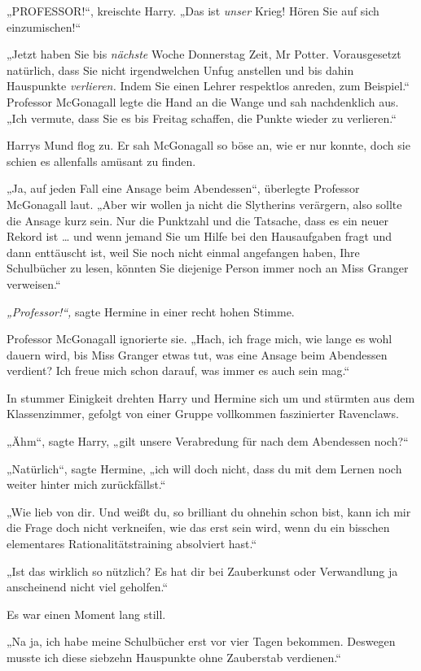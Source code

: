{„PROFESSOR!“, kreischte Harry. „Das ist \emph{unser} Krieg! Hören Sie auf sich einzumischen!“

„Jetzt haben Sie bis \emph{nächste} Woche Donnerstag Zeit, Mr Potter. Vorausgesetzt natürlich, dass Sie nicht irgendwelchen Unfug anstellen und bis dahin Hauspunkte \emph{verlieren.} Indem Sie einen Lehrer respektlos anreden, zum Beispiel.“ Professor McGonagall legte die Hand an die Wange und sah nachdenklich aus. „Ich vermute, dass Sie es bis Freitag schaffen, die Punkte wieder zu verlieren.“

Harrys Mund flog zu. Er sah McGonagall so böse an, wie er nur konnte, doch sie schien es allenfalls amüsant zu finden.

„Ja, auf jeden Fall eine Ansage beim Abendessen“, überlegte Professor McGonagall laut. „Aber wir wollen ja nicht die Slytherins verärgern, also sollte die Ansage kurz sein. Nur die Punktzahl und die Tatsache, dass es ein neuer Rekord ist … und wenn jemand Sie um Hilfe bei den Hausaufgaben fragt und dann enttäuscht ist, weil Sie noch nicht einmal angefangen haben, Ihre Schulbücher zu lesen, könnten Sie diejenige Person immer noch an Miss Granger verweisen.“

\emph{„Professor!“,} sagte Hermine in einer recht hohen Stimme.

Professor McGonagall ignorierte sie. „Hach, ich frage mich, wie lange es wohl dauern wird, bis Miss Granger etwas tut, was eine Ansage beim Abendessen verdient? Ich freue mich schon darauf, was immer es auch sein mag.“

In stummer Einigkeit drehten Harry und Hermine sich um und stürmten aus dem Klassenzimmer, gefolgt von einer Gruppe vollkommen faszinierter Ravenclaws.

„Ähm“, sagte Harry, „gilt unsere Verabredung für nach dem Abendessen noch?“

„Natürlich“, sagte Hermine, „ich will doch nicht, dass du mit dem Lernen noch weiter hinter mich zurückfällst.“

„Wie lieb von dir. Und weißt du, so brilliant du ohnehin schon bist, kann ich mir die Frage doch nicht verkneifen, wie das erst sein wird, wenn du ein bisschen elementares Rationalitätstraining absolviert hast.“

„Ist das wirklich so nützlich? Es hat dir bei Zauberkunst oder Verwandlung ja anscheinend nicht viel geholfen.“

Es war einen Moment lang still.

„Na ja, ich habe meine Schulbücher erst vor vier Tagen bekommen. Deswegen musste ich diese siebzehn Hauspunkte ohne Zauberstab verdienen.“

}
